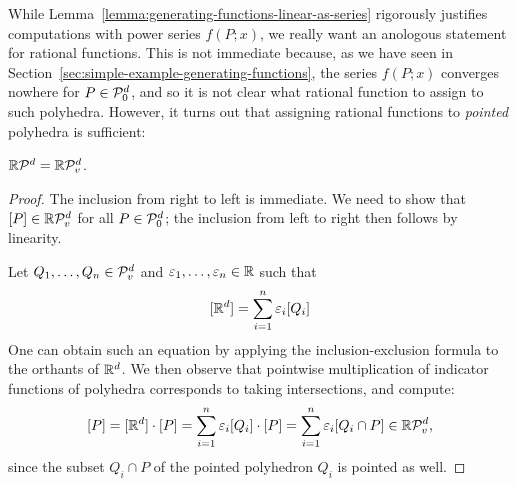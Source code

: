 While Lemma~\ref{lemma:generating-functions-linear-as-series}
rigorously justifies computations with power series $f(P;x)$,
we really want an anologous statement for rational functions.
This is not immediate because, as we have seen in Section~\ref{sec:simple-example-generating-functions},
the series $f(P;x)$ converges nowhere for $P \in \mathcal{P}_0^d$,
and so it is not clear what rational function to assign to such polyhedra.
However, it turns out that assigning rational functions to \emph{pointed} polyhedra is sufficient:

\begin{lemma}
  \label{lemma:algebra-generated-by-pointed}
  $\mathbb{R} \mathcal{P}^d = \mathbb{R}\mathcal{P}_v^d$.
\end{lemma}
\begin{proof}
  The inclusion from right to left is immediate.
  We need to show that $[P] \in \mathbb{R}\mathcal{P}_v^d$ for all $P \in \mathcal{P}_0^d$;
  the inclusion from left to right then follows by linearity.

  Let $Q_1, \ldots, Q_n \in \mathcal{P}_v^d$ and $\varepsilon_1, \ldots, \varepsilon_n \in \mathbb{R}$ such that
  \[
    [\mathbb{R}^d] = \sum_{i=1}^n \varepsilon_i [Q_i]
  \]
  One can obtain such an equation by applying the inclusion-exclusion formula to the orthants of $\mathbb{R}^d$.
  We then observe that pointwise multiplication of indicator functions of polyhedra
  corresponds to taking intersections, and compute:
  \[
    [P] = [\mathbb{R}^d] \cdot [P] = \sum_{i=1}^n \varepsilon_i [Q_i] \cdot [P] = \sum_{i=1}^n \varepsilon_i [Q_i \cap P] \in \mathbb{R}\mathcal{P}_v^d,
  \]
  since the subset $Q_i \cap P$ of the pointed polyhedron $Q_i$ is pointed as well.
\end{proof}
